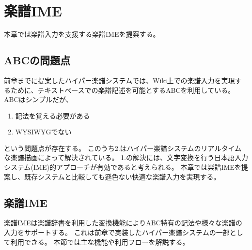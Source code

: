 \chapter{楽譜IME}
\label{chap:ime}

本章では楽譜入力を支援する楽譜IMEを提案する。

\newpage

\section{ABCの問題点}
前章までに提案したハイパー楽譜システムでは、Wiki上での楽譜入力を実現するために、テキストベースでの楽譜記述を可能とするABCを利用している。
ABCはシンプルだが、
\begin{enumerate}
    \item 記法を覚える必要がある
    \item WYSIWYGでない
\end{enumerate}という問題点が存在する。
このうち2.はハイパー楽譜システムのリアルタイムな楽譜描画によって解決されている。
1.の解決には、文字変換を行う日本語入力システム(IME)的アプローチが有効であると考えられる。
本章では楽譜IMEを提案し、既存システムと比較しても遜色ない快適な楽譜入力を実現する。

\section{楽譜IME}
楽譜IMEは楽譜辞書を利用した変換機能によりABC特有の記法や様々な楽譜の入力をサポートする。
これは前章で実装したハイパー楽譜システムの一部として利用できる。
本節では主な機能や利用フローを解説する。


